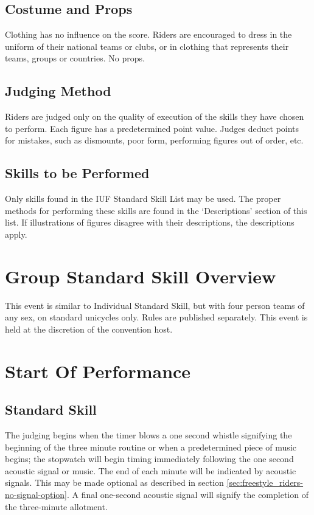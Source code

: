 \subsection{Costume and Props}
Clothing has no influence on the score.
Riders are encouraged to dress in the uniform of their national teams or clubs, or in clothing that represents their teams, groups or countries.
No props.

\subsection{Judging Method}
Riders are judged only on the quality of execution of the skills they have chosen to perform.
Each figure has a predetermined point value.
Judges deduct points for mistakes, such as dismounts, poor form, performing figures out of order, etc.

\subsection{Skills to be Performed}
Only skills found in the IUF Standard Skill List may be used.
The proper methods for performing these skills are found in the `Descriptions' section of this list.
If illustrations of figures disagree with their descriptions, the descriptions apply.

\section{Group Standard Skill Overview}
This event is similar to Individual Standard Skill, but with four person teams of any sex, on standard unicycles only.
Rules are published separately.
This event is held at the discretion of the convention host.

\section{Start Of Performance}

\subsection{Standard Skill}
The judging begins when the timer blows a one second whistle signifying the beginning of the three minute routine or when a predetermined piece of music begins; the stopwatch will begin timing immediately following the one second acoustic signal or music.
The end of each minute will be indicated by acoustic signals.
This may be made optional as described in section \ref{sec:freestyle_riders-no-signal-option}.
A final one-second acoustic signal will signify the completion of the three-minute allotment.

